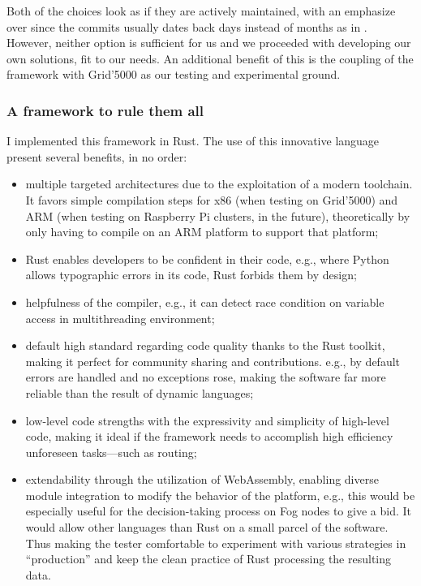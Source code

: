 Both of the choices look as if they are actively maintained, with an emphasize over \cite{smartfog_fogflow_2022} since the commits usually dates back days instead of months as in \cite{deng_fogbus2_2021}.
However, neither option is  sufficient for us and we proceeded with developing our own solutions, fit to our needs. An additional benefit of this is the coupling of the framework with Grid'5000 as our testing and experimental ground.

\subsubsection{A framework to rule them all}

I implemented this framework in Rust. The use of this innovative language present several benefits, in no order:
\begin{itemize}
	\item multiple targeted architectures due to the exploitation of a modern toolchain. It favors simple compilation steps for x86 (when testing on Grid'5000) and ARM (when testing on Raspberry Pi clusters, in the future), theoretically by only having to compile on an ARM platform to support that platform;
	\item Rust enables developers to be confident in their code, e.g., where Python allows typographic errors in its code, Rust forbids them by design;
	\item helpfulness of the compiler, e.g., it can detect race condition on variable access in multithreading environment;
	\item default high standard regarding code quality thanks to the Rust toolkit, making it perfect for community sharing and contributions. e.g., by default errors are handled and no exceptions rose, making the software far more reliable than the result of dynamic languages;
	\item low-level code strengths with the expressivity and simplicity of high-level code, making it ideal if the framework needs to accomplish high efficiency unforeseen tasks—such as routing;
	\item extendability through the utilization of WebAssembly, enabling diverse module integration to modify the behavior of the platform,  e.g., this would be especially useful for the decision-taking process on Fog nodes to give a bid. It would allow other languages than Rust on a small parcel of the software. Thus making the tester comfortable to experiment with various strategies in “production” and keep the clean practice of Rust processing the resulting data.
\end{itemize}

